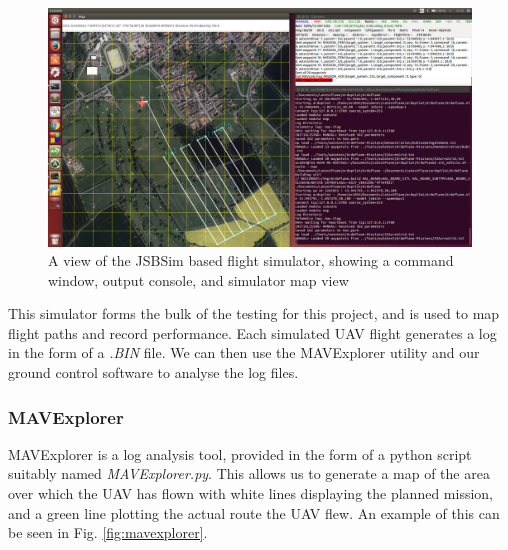 \begin{figure}[htbp!] 
\centering    
\includegraphics[width=\textwidth]{JSBSim}
\caption[JSBSim Simulator]{A view of the JSBSim based flight simulator, showing a command window, output console, and simulator map view}
\label{fig:jsbsim}
\end{figure}

This simulator forms the bulk of the testing for this project, and is used to map flight paths and record performance. Each simulated UAV flight generates a log in the form of a \textit{.BIN} file. We can then use the MAVExplorer utility and our ground control software to analyse the log files. 

\subsubsection{MAVExplorer}
\label{intro:mavexplorer}
MAVExplorer is a log analysis tool, provided in the form of a python script suitably named \textit{MAVExplorer.py}. This allows us to generate a map of the area over which the UAV has flown with white lines displaying the planned mission, and a green line plotting the actual route the UAV flew. An example of this can be seen in Fig. \ref{fig:mavexplorer}.

